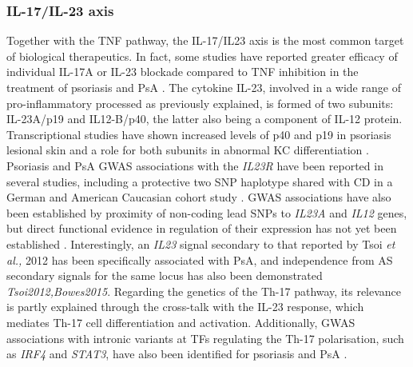 \subsubsection*{IL-17/IL-23 axis}
Together with the TNF pathway, the IL-17/IL23 axis is the most common target of biological therapeutics. In fact, some studies have reported greater efficacy of individual IL-17A or IL-23 blockade compared to TNF inhibition in the treatment of psoriasis and PsA \parencite{Griffiths2015,Blauvelt2017}. 
The cytokine IL-23, involved in a wide range of pro-inflammatory processed as previously explained, is formed of two subunits: IL-23A/p19 and IL12-B/p40, the latter also being a component of IL-12 protein. Transcriptional studies have shown increased levels of p40 and p19 in psoriasis lesional skin and a role for both subunits in abnormal KC differentiation \parencite{Lee2004,Zhu2011}. Psoriasis and PsA GWAS associations with the \textit{IL23R} have been reported in several studies, including a protective two SNP haplotype shared with CD in a German and American Caucasian cohort study \parencite{Nair2008, Strange2010, Tsoi2012}. GWAS associations have also been established by proximity of non-coding lead SNPs to \textit{IL23A} and \textit{IL12} genes, but direct functional evidence in regulation of their expression has not yet been established \parencite{Cargill2007,Strange2010,Tsoi2012}.
Interestingly, an \textit{IL23} signal secondary to that reported by Tsoi \textit{et al.,} 2012 has been specifically associated with PsA, and independence from AS secondary signals for the same locus has also been demonstrated \textit{Tsoi2012,Bowes2015}. 
Regarding the genetics of the Th-17 pathway, its relevance is partly explained through the cross-talk with the IL-23 response, which mediates Th-17 cell differentiation and activation. Additionally, GWAS associations with intronic variants at TFs regulating the Th-17 polarisation, such as \textit{IRF4} and \textit{STAT3}, have also been identified for psoriasis and PsA \parencite{ Tsoi2012,Huber2008,Harris2007}. 
